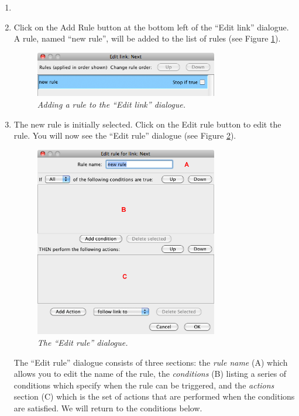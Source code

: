 \documentclass{article}
\begin{document}
\begin{enumerate}
\item \item Click on the Add Rule button at the bottom left of the ``Edit link''
dialogue. A rule, named ``new rule'', will be added to the list of rules (see
Figure \ref{fig:new_rule}).

\begin{figure}[ht]
  \centering
  \includegraphics[width=8cm]{images/hypedyn-tutorial-1-figure-8b}
  \caption{\textit{Adding a rule to the ``Edit link'' dialogue.}}
  \label{fig:new_rule}
\end{figure} 

\item The new rule is initially selected. Click on the Edit rule button to edit
the rule. You will now see the ``Edit rule'' dialogue (see Figure
\ref{fig:edit_rule}).

\begin{figure}[ht]
  \centering
  \includegraphics[width=8cm]{images/hypedyn-tutorial-1-figure-8c}
  \caption{\textit{The ``Edit rule'' dialogue.}}
  \label{fig:edit_rule}
\end{figure} 

The ``Edit rule'' dialogue consists of three sections: the \textit{rule name} (A)
which allows you to edit the name of the rule, the \textit{conditions} (B)
listing a series of conditions which specify when the rule can be triggered, and
the \textit{actions} section (C) which is the set of actions that are performed
when the conditions are satisfied. We will return to the conditions below.


\end{enumerate}
\end{document}
